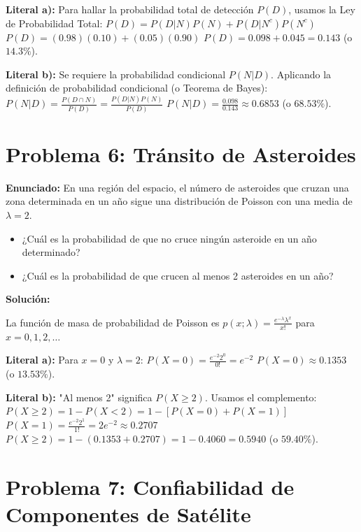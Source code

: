 \documentclass[12pt]{article}
\begin{document}
\textbf{Literal a):} 
Para hallar la probabilidad total de detección $P(D)$, usamos la Ley de Probabilidad Total:
$P(D) = P(D|N)P(N) + P(D|N^c)P(N^c)$
$P(D) = (0.98)(0.10) + (0.05)(0.90)$
$P(D) = 0.098 + 0.045 = \mathbf{0.143}$ (o $14.3\%$).

\textbf{Literal b):} 
Se requiere la probabilidad condicional $P(N|D)$. Aplicando la definición de probabilidad condicional (o Teorema de Bayes):
$P(N|D) = \frac{P(D \cap N)}{P(D)} = \frac{P(D|N)P(N)}{P(D)}$
$P(N|D) = \frac{0.098}{0.143} \approx \mathbf{0.6853}$ (o $68.53\%$).

\vspace{1cm}

\section*{Problema 6: Tránsito de Asteroides}

\textbf{Enunciado:}
En una región del espacio, el número de asteroides que cruzan una zona determinada en un año sigue una distribución de Poisson con una media de $\lambda = 2$.

\begin{itemize}
    \item[\textbf{a)}] ¿Cuál es la probabilidad de que no cruce ningún asteroide en un año determinado?
    \item[\textbf{b)}] ¿Cuál es la probabilidad de que crucen al menos 2 asteroides en un año?
\end{itemize}

\textbf{Solución:}

La función de masa de probabilidad de Poisson es $p(x; \lambda) = \frac{e^{-\lambda} \lambda^x}{x!}$ para $x = 0, 1, 2, \dots$

\textbf{Literal a):} 
Para $x = 0$ y $\lambda = 2$:
$P(X=0) = \frac{e^{-2} 2^0}{0!} = e^{-2}$
$P(X=0) \approx \mathbf{0.1353}$ (o $13.53\%$).

\textbf{Literal b):} 
"Al menos 2" significa $P(X \ge 2)$. Usamos el complemento:
$P(X \ge 2) = 1 - P(X < 2) = 1 - [P(X=0) + P(X=1)]$
$P(X=1) = \frac{e^{-2} 2^1}{1!} = 2e^{-2} \approx 0.2707$
$P(X \ge 2) = 1 - (0.1353 + 0.2707) = 1 - 0.4060 = \mathbf{0.5940}$ (o $59.40\%$).

\vspace{1cm}

\section*{Problema 7: Confiabilidad de Componentes de Satélite}
\end{document}
